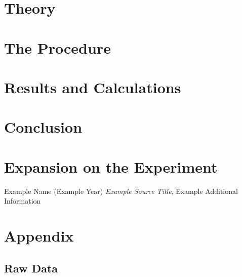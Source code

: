 \documentclass[11pt]{article}
\begin{document}


\section{Theory}



\section{The Procedure}



\section{Results and Calculations}



\section{Conclusion}



\section{Expansion on the Experiment}




\newpage




\begin{thebibliography}{100}


    Example Name (Example Year) \emph{Example Source Title}, Example Additional Information





\end{thebibliography}

\newpage

\section*{Appendix}

\subsection*{Raw Data}
\end{document}
